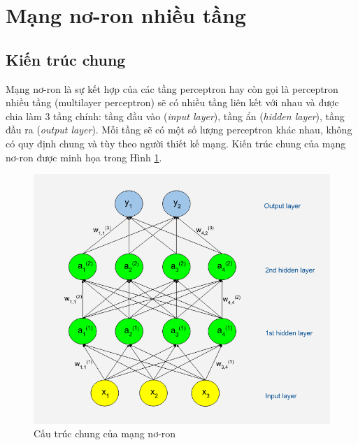 \section{Mạng nơ-ron nhiều tầng}
\subsection{Kiến trúc chung}
\label{sec:layer}
Mạng nơ-ron là sự kết hợp của các tầng perceptron hay còn gọi là perceptron nhiều tầng (multilayer perceptron) sẽ có nhiều tầng liên kết với nhau và được chia làm 3 tầng chính: tầng đầu vào (\textit{input layer}), tầng ẩn (\textit{hidden layer}), tầng đầu ra (\textit{output layer}). Mỗi tầng sẽ có một số lượng perceptron khác nhau, không có quy định chung và tùy theo người thiết kế mạng. Kiến trúc chung của mạng nơ-ron được minh họa trong Hình \ref{fig:neuralNetworkStruct}.
\begin{center}
 	\begin{figure}[H]
    \begin{center}
     \includegraphics[scale=0.8]{chap3/image/cautrucNN.png}
    \end{center}
    \caption{Cấu trúc chung của mạng nơ-ron}
    \label{fig:neuralNetworkStruct}
    \end{figure}
\end{center}

